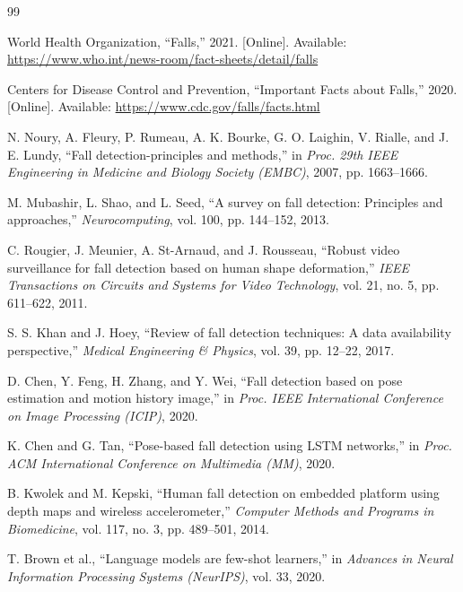 \documentclass[conference]{IEEEtran}
\begin{document}

\begin{thebibliography}{99}

World Health Organization, ``Falls,'' 2021. [Online]. Available: \url{https://www.who.int/news-room/fact-sheets/detail/falls}

Centers for Disease Control and Prevention, ``Important Facts about Falls,'' 2020. [Online]. Available: \url{https://www.cdc.gov/falls/facts.html}

N. Noury, A. Fleury, P. Rumeau, A. K. Bourke, G. O. Laighin, V. Rialle, and J. E. Lundy, ``Fall detection-principles and methods,'' in \textit{Proc. 29th IEEE Engineering in Medicine and Biology Society (EMBC)}, 2007, pp. 1663--1666.

M. Mubashir, L. Shao, and L. Seed, ``A survey on fall detection: Principles and approaches,'' \textit{Neurocomputing}, vol. 100, pp. 144--152, 2013.

C. Rougier, J. Meunier, A. St-Arnaud, and J. Rousseau, ``Robust video surveillance for fall detection based on human shape deformation,'' \textit{IEEE Transactions on Circuits and Systems for Video Technology}, vol. 21, no. 5, pp. 611--622, 2011.

S. S. Khan and J. Hoey, ``Review of fall detection techniques: A data availability perspective,'' \textit{Medical Engineering \& Physics}, vol. 39, pp. 12--22, 2017.

D. Chen, Y. Feng, H. Zhang, and Y. Wei, ``Fall detection based on pose estimation and motion history image,'' in \textit{Proc. IEEE International Conference on Image Processing (ICIP)}, 2020.

K. Chen and G. Tan, ``Pose-based fall detection using LSTM networks,'' in \textit{Proc. ACM International Conference on Multimedia (MM)}, 2020.

B. Kwolek and M. Kepski, ``Human fall detection on embedded platform using depth maps and wireless accelerometer,'' \textit{Computer Methods and Programs in Biomedicine}, vol. 117, no. 3, pp. 489--501, 2014.

T. Brown et al., ``Language models are few-shot learners,'' in \textit{Advances in Neural Information Processing Systems (NeurIPS)}, vol. 33, 2020.


\end{thebibliography}
\end{document}
